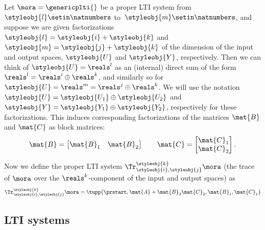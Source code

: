 \begin{definition}\label{def:trace-lti-prop}
    Let $\mora = \genericplti{}$ be a proper LTI system from $\styleobj{l}\setin \natnumbers$ to~$\styleobj{m}\setin \natnumbers$, and suppose we are given factorizations $\styleobj{l} = \styleobj{i} + \styleobj{k}$ and $\styleobj{m} = \styleobj{j} + \styleobj{k}$ of the dimension of the input and output spaces, $\styleobj{U}$ and $\styleobj{Y}$, respectively.
    Then we can think of $\styleobj{U} = \reals^l$ as an (internal) direct sum of the form $\reals^l = \reals^i \oplus \reals^k$, and similarly so for $\styleobj{U} = \reals^m = \reals^j \oplus \reals^k$.
    We will use the notation $\styleobj{U} = \styleobj{U_1} \oplus \styleobj{U_2}$ and $\styleobj{Y} = \styleobj{Y_1} \oplus \styleobj{Y_2}$, respectively for these factorizations.
    This induces corresponding factorizations of the matrices $\mat{B}$ and $\mat{C}$ as block matrices:
    \begin{equation}
        \mat{B} =
        \begin{bmatrix}
            \mat{B}_1 & \mat{B}_2
        \end{bmatrix}
        \qquad
        \mat{C} =
        \begin{bmatrix}
            \mat{C}_1 \\
            \mat{C}_2
        \end{bmatrix}.
    \end{equation}

    Now we define the proper LTI system $\Tr_{\styleobj{i},\styleobj{j}}^{\styleobj{k}}\mora$ (the trace of $\mora$ over the $\reals^k$-component of the input and output spaces) as
    \begin{equation}\label{eq:proper-LTI-trace-formula}
        \Tr_{\styleobj{i},\styleobj{j}}^{\styleobj{k}}\mora = \tupp{\prstart,\mat{A} + \mat{B}_2 \mat{C}_2, \mat{B}_1,\mat{C}_1}
    \end{equation}
\end{definition}


\subsection{LTI systems}

